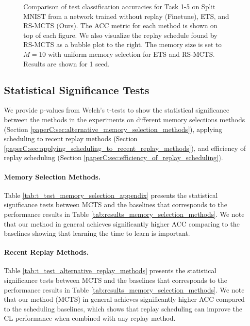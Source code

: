 \begin{figure}[t]
  \centering
  \setlength{\figwidth}{0.27\textwidth}
  \setlength{\figheight}{.15\textheight}
  
  \vspace{-3mm}
  \caption{ Comparison of test classification accuracies for Task 1-5 on Split MNIST from a network trained without replay (Finetune), ETS, and RS-MCTS (Ours). The ACC metric for each method is shown on top of each figure. We also visualize the replay schedule found by RS-MCTS as a bubble plot to the right. The memory size is set to $M=10$ with uniform memory selection for ETS and RS-MCTS. Results are shown for 1 seed. 
  }
  \vspace{-3mm}
  \label{fig:split_mnist_task_accuracies_and_bubble_plot}
\end{figure}



\subsection{Statistical Significance Tests}\label{paperC:app:statistical_significance_tests}

We provide p-values from Welch's t-tests to show the statistical significance between the methods in the experiments on different memory selections methods (Section \ref{paperC:sec:alternative_memory_selection_methods}), applying scheduling to recent replay methods (Section \ref{paperC:sec:applying_scheduling_to_recent_replay_methods}), and efficiency of replay scheduling (Section \ref{paperC:sec:efficiency_of_replay_scheduling}).

\vspace{-3mm}
\paragraph{Memory Selection Methods.} Table \ref{tab:t_test_memory_selection_appendix} presents the statistical significance tests between MCTS and the baselines that corresponds to the performance results in Table \ref{tab:results_memory_selection_methods}. We note that our method in general achieves significantly higher ACC comparing to the baselines showing that learning the time to learn is important.



\vspace{-3mm}
\paragraph{Recent Replay Methods.} Table \ref{tab:t_test_alternative_replay_methods} presents the statistical significance tests between MCTS and the baselines that corresponds to the performance results in Table \ref{tab:results_memory_selection_methods}. We note that our method (MCTS) in general achieves significantly higher ACC compared to the scheduling baselines, which shows that replay scheduling can improve the CL performance when combined with any replay method. 


